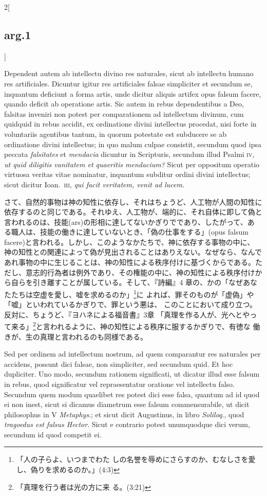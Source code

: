 \documentclass[paper=a4paper,fontsize=10pt,jafontsize=9pt,titlepage]{jlreq}
\begin{document}
\begin{paracol}{2}[\subsection{arg.1}]
\switchcolumn*


Dependent autem
ab intellectu divino res naturales, sicut ab intellectu humano res
artificiales. Dicuntur igitur res artificiales falsae simpliciter et
secundum se, inquantum deficiunt a forma artis, unde dicitur aliquis
artifex opus falsum facere, quando deficit ab operatione artis. Sic
autem in rebus dependentibus a Deo, falsitas inveniri non potest per
comparationem ad intellectum divinum, cum quidquid in rebus accidit, ex
ordinatione divini intellectus procedat, nisi forte in voluntariis
agentibus tantum, in quorum potestate est subducere se ab ordinatione
divini intellectus; in quo malum culpae consistit, secundum quod ipsa
peccata {\itshape falsitates} et {\itshape mendacia} dicuntur in Scripturis, secundum illud
Psalmi {\scshape iv}, {\itshape ut quid diligitis vanitatem et quaeritis mendacium?} Sicut per
oppositum operatio virtuosa veritas vitae nominatur, inquantum subditur
ordini divini intellectus; sicut dicitur Ioan.~{\scshape iii}, {\itshape qui facit veritatem,
venit ad lucem}.

\switchcolumn

さて、自然的事物は神の知性に依存し、それはちょうど、人工物が人間の知性に
 依存するのと同じである。それゆえ、人工物が、端的に、それ自体に即して偽と
 言われるのは、技能(ars)の形相に達してないかぎりでであり、したがって、あ
 る職人は、技能の働きに達していないとき、「偽の仕事をする」(opus falsum
 facere)と言われる。しかし、このようなかたちで、神に依存する事物の中に、
 神の知性との関連によって偽が見出されることはありえない。なぜなら、なんで
 あれ事物の中に生じることは、神の知性による秩序付けに基づくからである。た
 だし、意志的行為者は例外であり、その権能の中に、神の知性による秩序付けか
 ら自らを引き離すことが属している。そして、『詩編』4 章の、かの「なぜあな
 たたちは空虚を愛し、嘘を求めるのか」\footnote{「人の子らよ、いつまでわた
 しの名誉を辱めにさらすのか、むなしさを愛し、偽りを求めるのか。」(4:3)}に
 よれば、罪そのものが「虚偽」や「嘘」といわれているかぎりで、罪という悪は、
 このことにおいて成り立つ。反対に、ちょうど、『ヨハネによる福音書』3章
 「真理を作る人が、光へとやって来る」\footnote{「真理を行う者は光の方に来
 る。(3:21)}と言われるように、神の知性による秩序に服するかぎりで、有徳な
 働きが、生の真理と言われるのも同様である。

\switchcolumn*


Sed per ordinem ad intellectum nostrum, ad quem comparantur res
naturales per accidens, possunt dici falsae, non simpliciter, sed
secundum quid. Et hoc dupliciter. Uno modo, secundum rationem
significati, ut dicatur illud esse falsum in rebus, quod significatur
vel repraesentatur oratione vel intellectu falso. Secundum quem modum
quaelibet res potest dici esse falsa, quantum ad id quod ei non inest,
sicut si dicamus diametrum esse falsum commensurabile, ut dicit
philosophus in V {\itshape Metaphys}.; et sicut dicit Augustinus, in
libro {\itshape Soliloq}., quod {\itshape tragoedus est falsus
Hector}. Sicut e contrario potest unumquodque dici verum, secundum id
quod competit ei.


\end{paracol}
\end{document}
